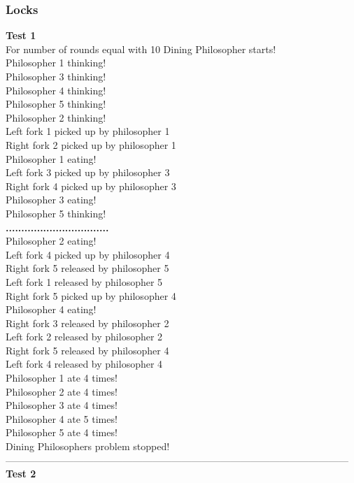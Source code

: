 \documentclass[14pt]{article}
\begin{document}
\subsubsection{Locks}
\textbf{Test 1}
\\For number of rounds equal with 10 Dining Philosopher starts!
\\Philosopher 1 thinking!
\\Philosopher 3 thinking!
\\Philosopher 4 thinking!
\\Philosopher 5 thinking!
\\Philosopher 2 thinking!
\\Left fork 1 picked up by philosopher 1
\\Right fork 2 picked up by philosopher 1
\\Philosopher 1 eating!
\\Left fork 3 picked up by philosopher 3
\\Right fork 4 picked up by philosopher 3
\\Philosopher 3 eating!
\\Philosopher 5 thinking!
\\\textbf{.................................}
\\Philosopher 2 eating!
\\Left fork 4 picked up by philosopher 4
\\Right fork 5 released by philosopher 5
\\Left fork 1 released by philosopher 5
\\Right fork 5 picked up by philosopher 4
\\Philosopher 4 eating!
\\Right fork 3 released by philosopher 2
\\Left fork 2 released by philosopher 2
\\Right fork 5 released by philosopher 4
\\Left fork 4 released by philosopher 4
\\Philosopher 1 ate 4 times!
\\Philosopher 2 ate 4 times!
\\Philosopher 3 ate 4 times!
\\Philosopher 4 ate 5 times!
\\Philosopher 5 ate 4 times!
\\Dining Philosophers problem stopped!
\\---------------------------------------------------------------------------------------------------------
\\\textbf{Test 2}
\end{document}
